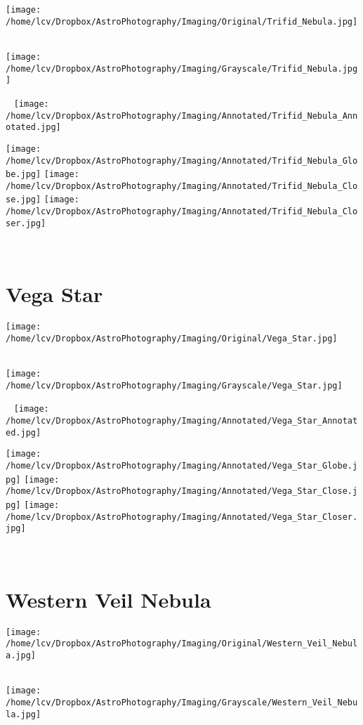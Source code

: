 \texttt{[image: /home/lcv/Dropbox/AstroPhotography/Imaging/Original/Trifid\_Nebula.jpg]}
{\footnotesize\color{white}


}\ \\
\texttt{[image: /home/lcv/Dropbox/AstroPhotography/Imaging/Grayscale/Trifid\_Nebula.jpg]}
\begin{center}
 \ \newpage
\texttt{[image: /home/lcv/Dropbox/AstroPhotography/Imaging/Annotated/Trifid\_Nebula\_Annotated.jpg]}

\texttt{[image: /home/lcv/Dropbox/AstroPhotography/Imaging/Annotated/Trifid\_Nebula\_Globe.jpg]}
\texttt{[image: /home/lcv/Dropbox/AstroPhotography/Imaging/Annotated/Trifid\_Nebula\_Close.jpg]}
\texttt{[image: /home/lcv/Dropbox/AstroPhotography/Imaging/Annotated/Trifid\_Nebula\_Closer.jpg]}
\end{center}
\ \\\section{Vega Star}
\texttt{[image: /home/lcv/Dropbox/AstroPhotography/Imaging/Original/Vega\_Star.jpg]}
{\footnotesize\color{white}


}\ \\
\texttt{[image: /home/lcv/Dropbox/AstroPhotography/Imaging/Grayscale/Vega\_Star.jpg]}
\begin{center}
 \ \newpage
\texttt{[image: /home/lcv/Dropbox/AstroPhotography/Imaging/Annotated/Vega\_Star\_Annotated.jpg]}

\texttt{[image: /home/lcv/Dropbox/AstroPhotography/Imaging/Annotated/Vega\_Star\_Globe.jpg]}
\texttt{[image: /home/lcv/Dropbox/AstroPhotography/Imaging/Annotated/Vega\_Star\_Close.jpg]}
\texttt{[image: /home/lcv/Dropbox/AstroPhotography/Imaging/Annotated/Vega\_Star\_Closer.jpg]}
\end{center}
\ \\\section{Western Veil Nebula}
\texttt{[image: /home/lcv/Dropbox/AstroPhotography/Imaging/Original/Western\_Veil\_Nebula.jpg]}
{\footnotesize\color{white}


}\ \\
\texttt{[image: /home/lcv/Dropbox/AstroPhotography/Imaging/Grayscale/Western\_Veil\_Nebula.jpg]}
